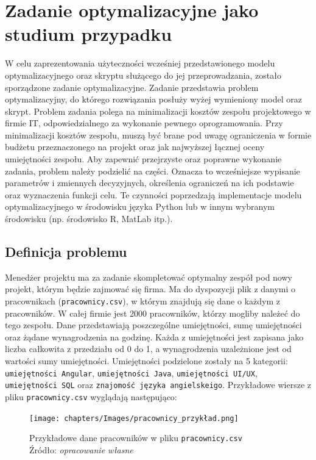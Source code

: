 \section{Zadanie optymalizacyjne jako studium przypadku} \label{sec:studium}
\par W celu zaprezentowania użyteczności wcześniej przedstawionego modelu optymalizacyjnego oraz skryptu służącego do jej przeprowadzania, zostało sporządzone zadanie optymalizacyjne. Zadanie przedstawia problem optymalizacyjny, do którego rozwiązania posłuży wyżej wymieniony model oraz skrypt. Problem zadania polega na minimalizacji kosztów zespołu projektowego w firmie IT, odpowiedzialnego za wykonanie pewnego oprogramowania. Przy minimalizacji kosztów zespołu, muszą być brane pod uwagę ograniczenia w formie budżetu przeznaczonego na projekt oraz jak najwyższej łącznej oceny umiejętności zespołu. Aby zapewnić przejrzyste oraz poprawne wykonanie zadania, problem należy podzielić na części. Oznacza to wcześniejsze wypisanie parametrów i zmiennych decyzyjnych, określenia ograniczeń na ich podstawie oraz wyznaczenia funkcji celu. Te czynności poprzedzają implementacje modelu optymalizacyjnego w środowisku języka Python lub w innym wybranym środowisku (np. środowisko R, MatLab itp.).

    \subsection{Definicja problemu}\label{subsec:problem}
    \par Menedżer projektu ma za zadanie skompletować optymalny zespół pod nowy projekt, którym będzie zajmować się firma. Ma do dyspozycji plik z danymi o pracownikach (\verb|pracownicy.csv|), w którym znajdują się dane o każdym z pracowników. W całej firmie jest 2000 pracowników, którzy mogliby należeć do tego zespołu. Dane przedstawiają poszczególne umiejętności, sumę umiejętności oraz żądane wynagrodzenia na godzinę. Każda z umiejętności jest zapisana jako liczba całkowita z przedziału od 0 do 1, a wynagrodzenia uzależnione jest od wartości sumy umiejętności. Umiejętności podzielone zostały na 5 kategorii: \verb|umiejętności Angular|, \verb|umiejętności Java|, \verb|umiejętności UI/UX|, \verb|umiejętności SQL| oraz \verb|znajomość języka angielskeigo|. Przykładowe wiersze z pliku \verb|pracownicy.csv| wyglądają następująco:
    \begin{figure}[H]
        \centering
        \texttt{[image: chapters/Images/pracownicy\_przykład.png]}
        \cprotect\caption{Przykładowe dane pracowników w pliku \verb|pracownicy.csv|\\ Źródło:\textit{ opracowanie własne}} 
    \end{figure}


